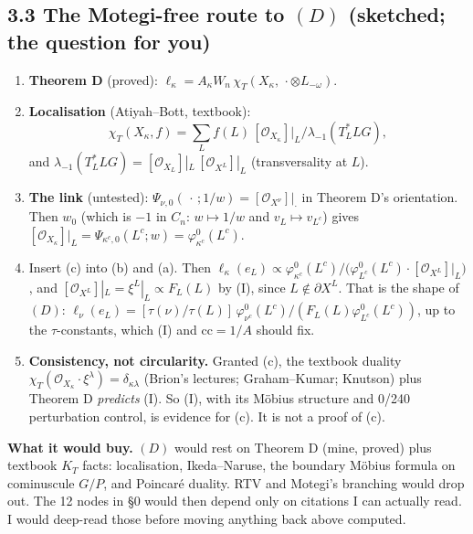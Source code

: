 \documentclass[11pt]{article}
\newcommand{\gr}[1]{\textsf{#1}}
\theoremstyle{plain}
\begin{document}
\subsection*{3.3 The Motegi-free route to $(D)$ (\gr{sketched}; the question for you)}
\begin{enumerate}[leftmargin=*,itemsep=2pt]
\item[(a)] \textbf{Theorem D} (\gr{proved}): $\ell_\kappa=A_\kappa W_n\,\chi_T(X_\kappa,\,\cdot\otimes L_{-\omega})$.
\item[(b)] \textbf{Localisation} (Atiyah--Bott, textbook):
  \[\chi_T(X_\kappa,f)=\sum_Lf(L)\,[\mathcal O_{X_\kappa}]|_L\big/\lambda_{-1}(T^*_LLG),\]
  and $\lambda_{-1}(T^*_LLG)=[\mathcal O_{X_L}]|_L\,[\mathcal O_{X^L}]|_L$ (transversality at $L$).
\item[(c)] \textbf{The link} (\gr{untested}): $\Psi_{\nu,0}(\,\cdot\,;1/w)=[\mathcal O_{X^\nu}]|_\cdot$ in Theorem D's
  orientation. Then $w_0$ (which is $-1$ in $C_n$: $w\mapsto1/w$ and $v_L\mapsto v_{L^c}$) gives
  $[\mathcal O_{X_\kappa}]|_L=\Psi_{\kappa^c,0}(L^c;w)=\varphi^0_{\kappa^c}(L^c)$.
\item[(d)] Insert (c) into (b) and (a). Then $\ell_\kappa(e_L)\propto\varphi^0_{\kappa^c}(L^c)/
  \big(\varphi^0_{L^c}(L^c)\cdot[\mathcal O_{X^L}]|_L\big)$, and $[\mathcal O_{X^L}]|_L=\xi^L|_L\propto F_L(L)$ by (I),
  since $L\notin\partial X^L$. That is the shape of $(D)$:
  $\ell_\nu(e_L)=[\tau(\nu)/\tau(L)]\,\varphi^0_{\nu^c}(L^c)/(F_L(L)\varphi^0_{L^c}(L^c))$, up to the $\tau$-constants,
  which (I) and $\mathrm{cc}=1/A$ should fix.
\item[(e)] \textbf{Consistency, not circularity.} Granted (c), the textbook duality
  $\chi_T(\mathcal O_{X_\kappa}\cdot\xi^\lambda)=\delta_{\kappa\lambda}$ (Brion's lectures; Graham--Kumar; Knutson) plus
  Theorem D \emph{predicts} (I). So (I), with its Möbius structure and 0/240 perturbation control, is evidence for (c).
  It is not a proof of (c).
\end{enumerate}
\textbf{What it would buy.} $(D)$ would rest on Theorem D (mine, proved) plus textbook $K_T$ facts: localisation,
Ikeda--Naruse, the boundary Möbius formula on cominuscule $G/P$, and Poincaré duality. RTV and Motegi's branching would
drop out. The 12 nodes in \S0 would then depend only on citations I can actually read. I would deep-read those before
moving anything back above \gr{computed}.
\end{document}
